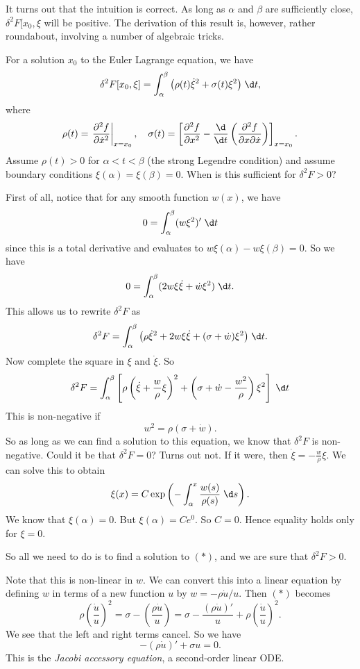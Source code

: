 \documentclass[a4paper]{article}
\begin{document}
It turns out that the intuition is correct. As long as $\alpha$ and $\beta$ are sufficiently close, $\delta^2 F[x_0, \xi$ will be positive. The derivation of this result is, however, rather roundabout, involving a number of algebraic tricks.

For a solution $x_0$ to the Euler Lagrange equation, we have
\[
  \delta^2 F[x_0, \xi] = \int_\alpha^\beta \big(\rho(t) \dot{\xi}^2 + \sigma(t) \xi^2\big)\;\d t,
\]
where
\[
  \rho(t) = \left.\frac{\partial^2 f}{\partial \dot{x}^2}\right|_{x = x_0},\quad
  \sigma(t) = \left[\frac{\partial^2 f}{\partial x^2} - \frac{\d}{\d t}\left(\frac{\partial^2 f}{\partial x \partial \dot{x}}\right)\right]_{x = x_0}.
\]
Assume $\rho(t) > 0$ for $\alpha < t < \beta$ (the strong Legendre condition) and assume boundary conditions $\xi(\alpha) = \xi(\beta) = 0$. When is this sufficient for $\delta^2 F > 0$?

First of all, notice that for any smooth function $w(x)$, we have
\[
  0 = \int_\alpha^\beta (w\xi^2)' \;\d t
\]
since this is a total derivative and evaluates to $w\xi(\alpha) - w\xi(\beta) = 0$. So we have
\[
  0 = \int_\alpha^\beta (2w\xi \dot{\xi} + \dot{w}\xi^2)\;\d t.
\]
This allows us to rewrite $\delta^2 F$ as
\[
  \delta^2 F = \int_\alpha^\beta \big(\rho \dot{\xi}^2 + 2w\xi \dot{\xi} + (\sigma + \dot{w})\xi^2\big)\;\d t.
\]
Now complete the square in $\xi$ and $\dot{\xi}$. So
\[
  \delta^2 F = \int_\alpha^\beta \left[\rho\left(\dot{\xi} + \frac{w}{\rho} \xi\right)^2 +\left(\sigma + \dot{w} - \frac{w^2}{\rho}\right)\xi^2 \right]\;\d t
\]
This is non-negative if
\[
  w^2 = \rho(\sigma + \dot{w}).\tag{$*$}
\]
So as long as we can find a solution to this equation, we know that $\delta^2 F$ is non-negative. Could it be that $\delta^2 F = 0$? Turns out not. If it were, then $\dot{\xi} = -\frac{w}{\rho}\xi$. We can solve this to obtain
\[
  \xi(x) = C\exp\left(-\int_\alpha^x \frac{w(s)}{\rho(s)}\;\d s\right).
\]
We know that $\xi(\alpha) = 0$. But $\xi(\alpha) = C e^0$. So $C = 0$. Hence equality holds only for $\xi = 0$.

So all we need to do is to find a solution to $(*)$, and we are sure that $\delta^2 F > 0$.

Note that this is non-linear in $w$. We can convert this into a linear equation by defining $w$ in terms of a new function $u$ by $w = -\rho \dot{u}/u$. Then $(*)$ becomes
\[
  \rho\left(\frac{\dot{u}}{u}\right)^2 = \sigma - \left(\frac{\rho \dot{u}}{u}\right) = \sigma - \frac{(\rho \dot{u})'}{u} + \rho \left(\frac{\dot{u}}{u}\right)^2.
\]
We see that the left and right terms cancel. So we have
\[
  -(\rho \dot{u})' + \sigma u = 0.
\]
This is the \emph{Jacobi accessory equation}, a second-order linear ODE.
\end{document}
